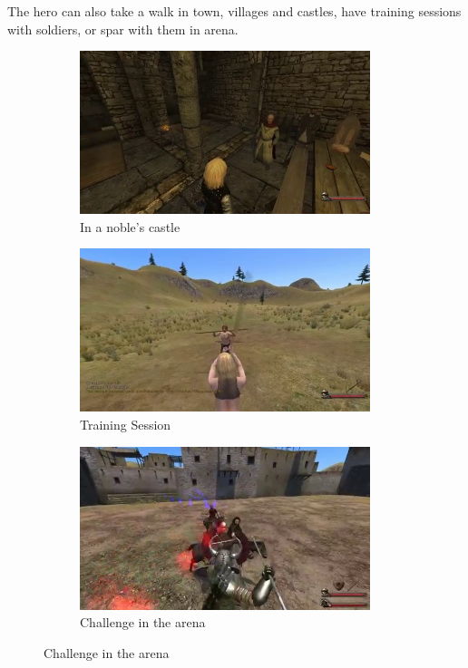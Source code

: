 \documentclass[
]{article}
\begin{document}
The hero can also take a walk in town, villages and castles, have training sessions with soldiers, or spar with them in arena.


\begin{figure}[H]
	\centering
	\begin{subfigure}[b]{0.3\textwidth}
		\includegraphics[width=\linewidth]{docimages/E_0055_00_33_54.jpg}
		\caption{In a noble's castle}
	\end{subfigure}
	\begin{subfigure}[b]{0.3\textwidth}
		\includegraphics[width=\linewidth]{docimages/E_0064_00_52_16.jpg}
		\caption{Training Session}
	\end{subfigure}
	\begin{subfigure}[b]{0.3\textwidth}
		\includegraphics[width=\linewidth]{docimages/E_0076_00_42_48.jpg}
		\caption{Challenge in the arena}
	\end{subfigure}
\end{figure}
\end{document}

